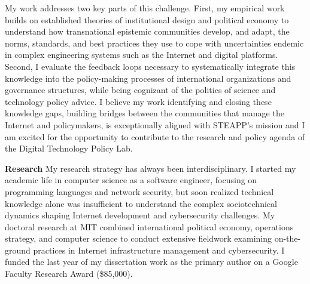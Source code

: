 \documentclass[11pt]{letter}
\begin{document}
\begin{letter}
My work addresses two key parts of this challenge. 
%
First, my empirical work builds on established theories of institutional design and political economy to understand how transnational epistemic communities develop, and adapt, the norms, standards, and best practices they use to cope with uncertainties endemic in complex engineering systems such as the Internet and digital platforms.
%
Second, I evaluate the feedback loops necessary to systematically integrate this knowledge into the policy-making processes of international organizations and governance structures, while being cognizant of the politics of science and technology policy advice.
%
%
I believe my work identifying and closing these knowledge gaps, building bridges between the communities that manage the Internet and policymakers, is exceptionally aligned with STEAPP's mission and I am excited for the opportunity to contribute to the research and policy agenda of the Digital Technology Policy Lab.




\textbf{Research} \vspace{0.2 \baselineskip} \newline %
%
My research strategy has always been interdisciplinary. 
%
I started my academic life in computer science as a software engineer, focusing on programming languages and network security, but soon realized technical knowledge alone was insufficient to understand the complex sociotechnical dynamics shaping Internet development and cybersecurity challenges.
My doctoral research at MIT combined international political economy, operations strategy, and computer science to conduct extensive fieldwork examining on-the-ground practices in Internet infrastructure management and cybersecurity.
%
I funded the last year of my dissertation work as the primary author on a Google Faculty Research Award (\$85,000). 
%


\end{letter}
\end{document}
